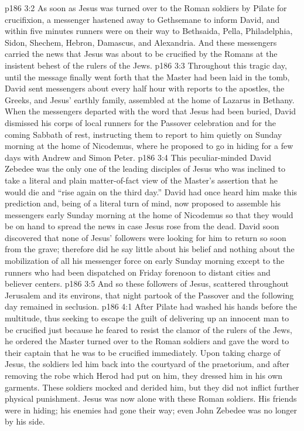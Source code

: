 \vs p186 3:2 As soon as Jesus was turned over to the Roman soldiers by Pilate for crucifixion, a messenger hastened away to Gethsemane to inform David, and within five minutes runners were on their way to Bethsaida, Pella, Philadelphia, Sidon, Shechem, Hebron, Damascus, and Alexandria. And these messengers carried the news that Jesus was about to be crucified by the Romans at the insistent behest of the rulers of the Jews.
\vs p186 3:3 Throughout this tragic day, until the message finally went forth that the Master had been laid in the tomb, David sent messengers about every half hour with reports to the apostles, the Greeks, and Jesus’ earthly family, assembled at the home of Lazarus in Bethany. When the messengers departed with the word that Jesus had been buried, David dismissed his corps of local runners for the Passover celebration and for the coming Sabbath of rest, instructing them to report to him quietly on Sunday morning at the home of Nicodemus, where he proposed to go in hiding for a few days with Andrew and Simon Peter.
\vs p186 3:4 This peculiar\hyp{}minded David Zebedee was the only one of the leading disciples of Jesus who was inclined to take a literal and plain matter\hyp{}of\hyp{}fact view of the Master’s assertion that he would die and \textcolor{ubdarkred}{“rise again on the third day.”} David had once heard him make this prediction and, being of a literal turn of mind, now proposed to assemble his messengers early Sunday morning at the home of Nicodemus so that they would be on hand to spread the news in case Jesus rose from the dead. David soon discovered that none of Jesus’ followers were looking for him to return so soon from the grave; therefore did he say little about his belief and nothing about the mobilization of all his messenger force on early Sunday morning except to the runners who had been dispatched on Friday forenoon to distant cities and believer centers.
\vs p186 3:5 And so these followers of Jesus, scattered throughout Jerusalem and its environs, that night partook of the Passover and the following day remained in seclusion.
\vs p186 4:1 After Pilate had washed his hands before the multitude, thus seeking to escape the guilt of delivering up an innocent man to be crucified just because he feared to resist the clamor of the rulers of the Jews, he ordered the Master turned over to the Roman soldiers and gave the word to their captain that he was to be crucified immediately. Upon taking charge of Jesus, the soldiers led him back into the courtyard of the praetorium, and after removing the robe which Herod had put on him, they dressed him in his own garments. These soldiers mocked and derided him, but they did not inflict further physical punishment. Jesus was now alone with these Roman soldiers. His friends were in hiding; his enemies had gone their way; even John Zebedee was no longer by his side.
